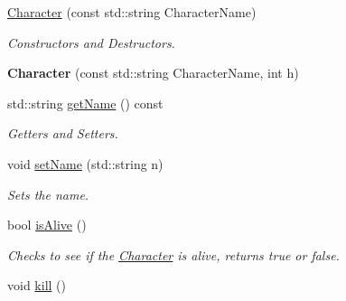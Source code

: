 \begin{DoxyCompactItemize}
\item 
\hypertarget{classCharacter_a0b0509282cf2dbb4a2aed19d2226ab16}{
\hyperlink{classCharacter_a0b0509282cf2dbb4a2aed19d2226ab16}{Character} (const std::string CharacterName)}
\label{classCharacter_a0b0509282cf2dbb4a2aed19d2226ab16}

\begin{DoxyCompactList}\small\item\em Constructors and Destructors. \item\end{DoxyCompactList}\item 
\hypertarget{classCharacter_a95a6a763b1f9ea188899ea63bb24f659}{
{\bfseries Character} (const std::string CharacterName, int h)}
\label{classCharacter_a95a6a763b1f9ea188899ea63bb24f659}

\item 
\hypertarget{classCharacter_a541f9063682bf9f9714702e7ffb2e64c}{
std::string \hyperlink{classCharacter_a541f9063682bf9f9714702e7ffb2e64c}{getName} () const }
\label{classCharacter_a541f9063682bf9f9714702e7ffb2e64c}

\begin{DoxyCompactList}\small\item\em Getters and Setters. \item\end{DoxyCompactList}\item 
\hypertarget{classCharacter_a9f3a54d21fb6c88cdebbc7bf29a9cab7}{
void \hyperlink{classCharacter_a9f3a54d21fb6c88cdebbc7bf29a9cab7}{setName} (std::string n)}
\label{classCharacter_a9f3a54d21fb6c88cdebbc7bf29a9cab7}

\begin{DoxyCompactList}\small\item\em Sets the name. \item\end{DoxyCompactList}\item 
\hypertarget{classCharacter_aa49f985b1b05751b2d4b3de74b4acc8c}{
bool \hyperlink{classCharacter_aa49f985b1b05751b2d4b3de74b4acc8c}{isAlive} ()}
\label{classCharacter_aa49f985b1b05751b2d4b3de74b4acc8c}

\begin{DoxyCompactList}\small\item\em Checks to see if the \hyperlink{classCharacter}{Character} is alive, returns true or false. \item\end{DoxyCompactList}\item 
\hypertarget{classCharacter_a5b708af3b8b185fd694722c7a566a4a7}{
void \hyperlink{classCharacter_a5b708af3b8b185fd694722c7a566a4a7}{kill} ()}
\label{classCharacter_a5b708af3b8b185fd694722c7a566a4a7}


\end{DoxyCompactItemize}
